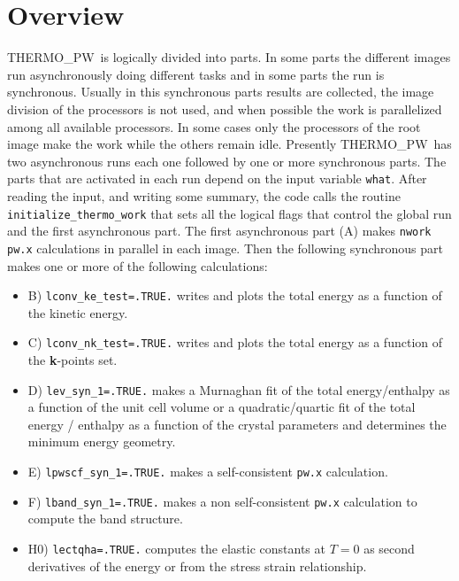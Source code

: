 \documentclass[12pt,a4paper]{article}
\def\tpw{{\sc THERMO\_PW}}
\begin{document}
\section{\color{coral}Overview}
\tpw\ is logically divided into parts. In some parts the different
images run asynchronously doing different tasks and in some parts the
run is synchronous. Usually in this synchronous parts results are 
collected, the image division of the processors is not used, and when possible
the work is parallelized among all available processors. In some cases
only the processors of the root image make the work while the others remain
idle.
Presently \tpw\ has two asynchronous runs each one followed
by one or more synchronous parts. The parts that are activated in
each run depend on the input variable \texttt{what}. After reading the input,
and writing some summary, the code calls the routine 
\texttt{initialize\_thermo\_work} that sets all the
logical flags that control the global run and the first asynchronous
part. The first asynchronous part (A) makes \texttt{nwork} \texttt{pw.x} 
calculations in parallel in each image. 
Then the following synchronous part makes one or more of
the following calculations:
\begin{itemize}

\item
B) \texttt{lconv\_ke\_test=.TRUE.} writes and plots the total
energy as a function of the kinetic energy.

\item
C) \texttt{lconv\_nk\_test=.TRUE.} writes and plots the total energy
as a function of the {\bf k}-points set.

\item
D) \texttt{lev\_syn\_1=.TRUE.} makes a Murnaghan fit of the 
total energy/enthalpy as a function of the unit cell volume or 
a quadratic/quartic fit of the total energy / enthalpy as a function 
of the crystal parameters and determines the minimum energy geometry.

\item
E) \texttt{lpwscf\_syn\_1=.TRUE.} makes a self-consistent \texttt{pw.x} 
calculation.

\item
F) \texttt{lband\_syn\_1=.TRUE.} makes a non self-consistent \texttt{pw.x}
calculation to compute the band structure.

\item
H0) \texttt{lectqha=.TRUE.} computes the elastic constants at $T=0$
as second derivatives of the energy or from the stress strain relationship. 

\end{itemize}
\end{document}

